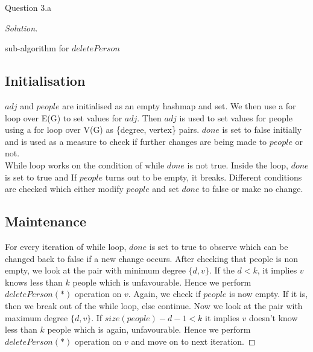 \begin{solution}{Question 3.a}
\begin{proof}[Solution]
        \begin{algorithm}[H]
            \caption{sub-algorithm for $deletePerson$}
            \begin{algorithmic}[1]
                \EndIf{}
                \EndFor
                \State{\Return{}}
                \EndProcedure{}
            \end{algorithmic}
        \end{algorithm}
        \subsection*{Initialisation}
        $adj$ and $people$ are initialised as an empty hashmap and set. We then use a for loop over E(G) to set values for $adj$. Then $adj$ is used to set values for people using a for loop over V(G) as \{degree, vertex\} pairs. $done$ is set to false initially and is used as a measure to check if further changes are being made to $people$ or not.\\
        While loop works on the condition of while $done$ is not true. Inside the loop, $done$ is set to true and If $people$ turns out to be empty, it breaks. Different conditions are checked which either modify $people$ and set $done$ to false or make no change.
        
        \subsection*{Maintenance}
        For every iteration of while loop, $done$ is set to true to observe which can be changed back to false if a new change occurs.
        After checking that people is non empty, we look at the pair with minimum degree $ \{ d, v \} $.
        If the $d < k$, it implies $v$ knows less than $k$ people which is unfavourable. Hence we perform $deletePerson(*)$ operation on $v$.
        Again, we check if $people$ is now empty. If it is, then we break out of the while loop, else continue.
        Now we look at the pair with maximum degree $ \{ d, v \} $.
        If $size(people)-d-1<k$ it implies $v$ doesn't know less than $k$ people which is again, unfavourable. Hence we perform $deletePerson(*)$ operation on $v$ and move on to next iteration.
        

\end{proof}
\end{solution}
